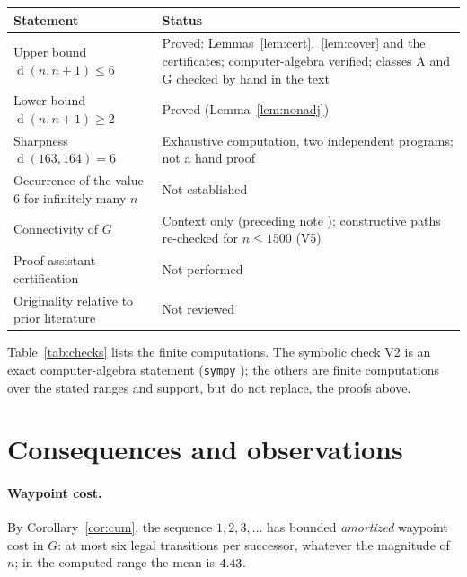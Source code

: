 \documentclass[11pt]{article}
\theoremstyle{definition}
\newcommand{\dist}{\operatorname{d}}
\begin{document}
\begin{center}\small
\begin{tabular}{@{}p{}p{}@{}}\toprule
Statement & Status\\ \midrule
Upper bound $\dist(n,n+1)\le6$ & Proved: Lemmas~\ref{lem:cert},~\ref{lem:cover} and the certificates; computer-algebra verified; classes A and G checked by hand in the text\\
Lower bound $\dist(n,n+1)\ge2$ & Proved (Lemma~\ref{lem:nonadj})\\
Sharpness $\dist(163,164)=6$ & Exhaustive computation, two independent programs; not a hand proof\\
Occurrence of the value $6$ for infinitely many $n$ & Not established\\
Connectivity of $G$ & Context only (preceding note \cite{u1}); constructive paths re-checked for $n\le1500$ (V5)\\
Proof-assistant certification & Not performed\\
Originality relative to prior literature & Not reviewed\\ \bottomrule
\end{tabular}
\end{center}

Table~\ref{tab:checks} lists the finite computations. The symbolic check V2 is an exact computer-algebra statement
(\texttt{sympy} \cite{sympy}); the others are finite computations over the stated ranges and support, but do not replace, the proofs above.
\begin{table}[h]\centering\small

\caption{Verification checks ($\TotalCases$ cases in total, deterministic exact arithmetic, report \texttt{u1\_bnd\_verification\_report.json}).}\label{tab:checks}
\end{table}

\section{Consequences and observations}\label{sec:cons}

\paragraph{Waypoint cost.}
By Corollary~\ref{cor:cum}, the sequence $1,2,3,\dots$ has bounded \emph{amortized} waypoint cost in $G$: at most six
legal transitions per successor, whatever the magnitude of $n$; in the computed range the mean is $4.43$.
\end{document}
